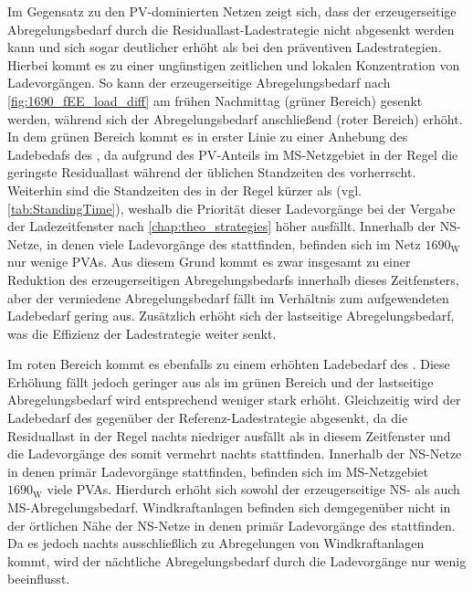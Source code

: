 Im Gegensatz zu den \gls{PV}-dominierten Netzen zeigt sich, dass der erzeugerseitige Abregelungsbedarf durch die Residuallast-Ladestrategie nicht abgesenkt werden kann und sich sogar deutlicher erhöht als bei den präventiven Ladestrategien.
Hierbei kommt es zu einer ungünstigen zeitlichen und lokalen Konzentration von Ladevorgängen.
So kann der erzeugerseitige Abregelungsbedarf nach \autoref{fig:1690_fEE_load_diff} am frühen Nachmittag (grüner Bereich) gesenkt werden, während sich der Abregelungsbedarf anschließend (roter Bereich) erhöht.
In dem grünen Bereich kommt es in erster Linie zu einer Anhebung des Ladebedafs des \UC \Firmeparkplatzdot, da aufgrund des \gls{PV}-Anteils im \gls{MS}-Netzgebiet in der Regel die geringste Residuallast während der üblichen Standzeiten des \UC \Firmeparkplatz vorherrscht.
Weiterhin sind die Standzeiten des \UC \Firmeparkplatz in der Regel kürzer als \zH (vgl. \autoref{tab:StandingTime}), weshalb die Priorität dieser Ladevorgänge bei der Vergabe der Ladezeitfenster nach \autoref{chap:theo_strategies} höher ausfällt.
Innerhalb der \gls{NS}-Netze, in denen viele Ladevorgänge des \UC \Firmeparkplatz stattfinden, befinden sich im Netz \(1690_{\text{W}}\) nur wenige \glspl{PVA}.
Aus diesem Grund kommt es zwar insgesamt zu einer Reduktion des erzeugerseitigen Abregelungsbedarfs innerhalb dieses Zeitfensters, aber der vermiedene Abregelungsbedarf fällt im Verhältnis zum aufgewendeten Ladebedarf gering aus.
Zusätzlich erhöht sich der lastseitige Abregelungsbedarf, was die Effizienz der Ladestrategie weiter senkt.



Im roten Bereich kommt es ebenfalls zu einem erhöhten Ladebedarf des \UC \Firmeparkplatzdot.
Diese Erhöhung fällt jedoch geringer aus als im grünen Bereich und der lastseitige Abregelungsbedarf wird entsprechend weniger stark erhöht.
Gleichzeitig wird der Ladebedarf des \UC \zH gegenüber der Referenz-Ladestrategie abgesenkt, da die Residuallast in der Regel nachts niedriger ausfällt als in diesem Zeitfenster und die Ladevorgänge des \UC \zH somit vermehrt nachts stattfinden.
Innerhalb der \gls{NS}-Netze in denen primär Ladevorgänge \zH stattfinden, befinden sich im \gls{MS}-Netzgebiet \(1690_{\text{W}}\) viele \glspl{PVA}.
Hierdurch erhöht sich sowohl der erzeugerseitige \gls{NS}- als auch \gls{MS}-Abregelungsbedarf.
Windkraftanlagen befinden sich demgegenüber nicht in der örtlichen Nähe der \gls{NS}-Netze in denen primär Ladevorgänge des \UC \zH stattfinden.
Da es jedoch nachts ausschließlich zu Abregelungen von Windkraftanlagen kommt, wird der nächtliche Abregelungsbedarf durch die Ladevorgänge nur wenig beeinflusst.


